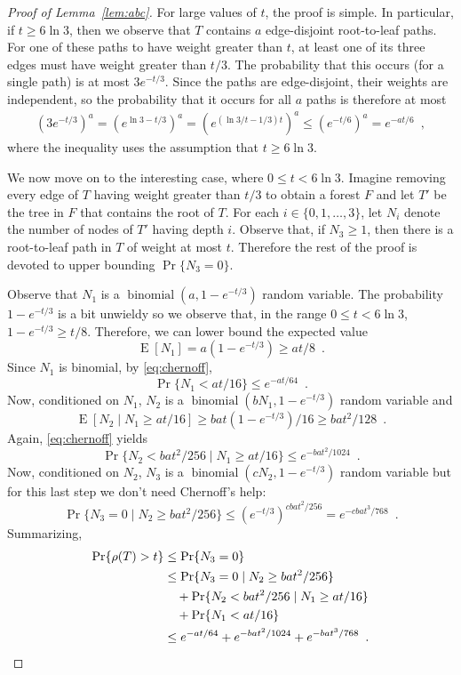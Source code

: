 \documentclass[a4paper,UKenglish]{lipics-v2016}
\DeclareMathOperator{\E}{E}
\DeclareMathOperator{\binomial}{binomial}
\begin{document}
\begin{proof}[Proof of Lemma~\ref{lem:abc}]
  For large values of $t$, the proof is simple. In particular, if $t\ge 6\ln 3$,
  then we observe that $T$ contains $a$ edge-disjoint root-to-leaf paths.
  For one of these paths to have weight greater than $t$, at least one of
  its three edges must have weight greater than $t/3$.  The probability
  that this occurs (for a single path) is at most $3e^{-t/3}$. Since
  the paths are edge-disjoint, their weights are independent, so the
  probability that it occurs for all $a$ paths is therefore at most
  \begin{align*}
     (3e^{-t/3})^a = (e^{\ln 3-t/3})^a = (e^{(\ln 3/t-1/3)t})^a \le (e^{-t/6})^a = e^{-at/6}\enspace ,
  \end{align*}
  where the inequality uses the assumption that $t\ge 6\ln 3$.

  We now move on to the interesting case, where
  $0\le t < 6\ln 3$. 
  Imagine removing every edge of $T$ having weight greater than $t/3$
  to obtain a forest $F$ and let $T'$ be the tree in $F$ that contains
  the root of $T$.  For each $i\in\{0,1,\ldots,3\}$, let $N_i$ denote
  the number of nodes of $T'$ having depth $i$.
  Observe that, if $N_3\ge 1$, then there is a root-to-leaf path in $T$
  of weight at most $t$.  Therefore the rest of the proof is devoted to
  upper bounding $\Pr\{N_3=0\}$.

  Observe that $N_1$ is a $\binomial(a,1-e^{-t/3})$ random variable.
  The probability $1-e^{-t/3}$ is a bit unwieldy so we observe that,
  in the range $0\le t < 6\ln 3$, $1-e^{-t/3}\ge t/8$.  Therefore, we
  can lower bound the expected value
  \[
     \E[N_1] = a(1-e^{-t/3}) \ge at/8 \enspace .
  \]
  Since $N_1$ is binomial, 
  by \eqref{eq:chernoff},
  \[
     \Pr\{ N_1 < at/16 \} \le e^{-at/64} \enspace .
  \]
  Now, conditioned on $N_1$, $N_2$ is a $\binomial(bN_1, 1-e^{-t/3})$ random variable and
  \[
      \E[N_2\mid N_1\ge at/16] \ge bat(1-e^{-t/3})/16 \ge bat^2/128 \enspace .
  \]
  Again, \eqref{eq:chernoff} yields
  \[
      \Pr\{N_2 < bat^2/256\mid N_1 \ge at/16\} \le e^{-bat^2/1024} \enspace .
  \]
  Now, conditioned on $N_2$, $N_3$ is a $\binomial(cN_2,1-e^{-t/3})$
  random variable but for this last step we don't need Chernoff's help:
  \[
      \Pr\{N_3 = 0 \mid N_2\ge bat^2/256\} \le (e^{-t/3})^{cbat^2/256}
          = e^{-cbat^3/768} \enspace .
  \]
  Summarizing,
  \begin{align*}
     \Pr\{\rho(T) > t\} 
                    & \le \Pr\{N_3 = 0\} \\
                    & \le \Pr\{N_3 = 0\mid N_2 \ge bat^2/256\} \\
                    &\quad{}+ \Pr\{N_2 < bat^2/256 \mid N_1 \ge at/16\} \\
                    &\quad{}+ \Pr\{N_1 < at/16\} \\
        & \le e^{-at/64} + e^{-bat^2/1024} + e^{-bat^3/768} \enspace .  \qedhere
  \end{align*}
\end{proof}
\end{document}
